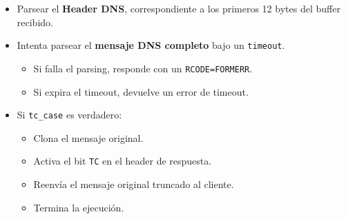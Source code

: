 


\begin{itemize}
    \item Parsear el \textbf{Header DNS}, correspondiente a los primeros 12 bytes del buffer recibido.  
    \item Intenta parsear el \textbf{mensaje DNS completo} bajo un \texttt{timeout}.
    \begin{itemize}
        \item Si falla el parsing, responde con un \texttt{RCODE=FORMERR}.
        \item Si expira el timeout, devuelve un error de timeout.
    \end{itemize}

    \item Si \texttt{tc\_case} es verdadero:
    \begin{itemize}
        \item Clona el mensaje original.
        \item Activa el bit \texttt{TC} en el header de respuesta.
        \item Reenvía el mensaje original truncado al cliente.
        \item Termina la ejecución.
    \end{itemize}


\end{itemize}
